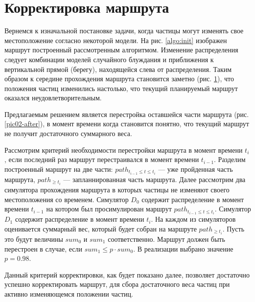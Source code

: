 \section{Корректировка маршрута}
\begin{figure}[ht]
  \centering
\begin{minipage}[t]{.4\textwidth}
  \centering
  \label{algo:init}
\end{minipage}
\begin{minipage}[t]{.4\textwidth}
  \centering
  \label{algo:before}
\end{minipage}
\end{figure}

Вернемся к изначальной постановке задачи, когда частицы могут изменять свое местоположение
согласно некоторой модели. На рис. \ref{algo:init} изображен маршрут построенный
рассмотренным алгоритмом. Изменение распределения следует комбинации моделей случайного
блуждания и приближения к вертикальной прямой (берегу), находящейся слева от распределения.
Таким образом к середине прохождения маршрута становится заметно (рис. \ref{algo:before}), что
положения частиц изменились настолько, что текущий планируемый маршрут оказался неудовлетворительным.

Предлагаемым решением является перестройка оставшейся части маршрута (рис. \ref{pic02-after}),
в момент времени когда становится понятно, что текущий маршрут не получит достаточного
суммарного веса.


Рассмотрим критерий необходимости перестройки маршрута в момент времени $t_i$, если последний
раз маршрут перестраивался в момент времени $t_{i-1}$. Разделим построенный
маршрут на две части: $path_{t_{i-1} \le t \le t_{i}}$ --- уже пройденная часть маршрута, $path_{\ge t_{i}}$
--- запланнированная часть маршрута. Далее рассмотрим два симулятора прохождения маршрута в которых
частицы не изменяют своего местоположения со временем. Симулятор $D_0$ содержит распределение
в момент времени $t_{i-1}$ на котором был просимулирован маршрут $path_{t_{i-1} \le t \le t_{i}}$.
Симулятор $D_1$ содержит распределение в момент времени $t_i$. На каждом из симуляторов оценивается
суммарный вес, который будет собран на маршруте $path_{\ge t_{i}}$. Пусть это будут величины
$sum_0$ и $sum_1$ соответственно. Маршрут должен быть перестроен в случае, если
 $sum_1 \le p \cdot sum_0$. В реализации выбрано значение $p = 0.98$.

Данный критерий корректировки, как будет показано далее, позволяет достаточно успешно корректировать
маршрут, для сбора достаточного веса частиц при активно изменяющемся положении частиц.

\FloatBarrier


